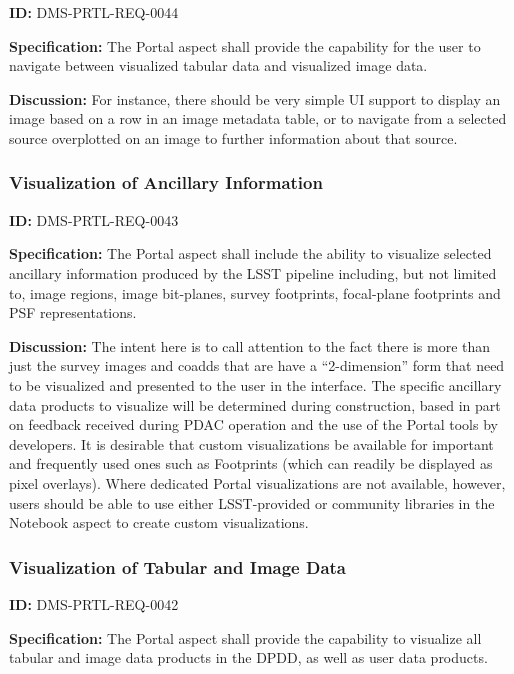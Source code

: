 \documentclass[SE,toc,lsstdraft]{lsstdoc}
\begin{document}
\label{DMS-PRTL-REQ-0044}
\textbf{ID:} DMS-PRTL-REQ-0044

\textbf{Specification:}
The Portal aspect shall provide the capability for the user to navigate between visualized tabular data and visualized image data.

\textbf{Discussion:}
For instance, there should be very simple UI support to display an image based on a row in an image metadata table, or to navigate from a selected source overplotted on an image to further information about that source.

\subsubsection{Visualization of Ancillary Information}

\label{DMS-PRTL-REQ-0043}
\textbf{ID:} DMS-PRTL-REQ-0043

\textbf{Specification:}
The Portal aspect shall include the ability to visualize selected ancillary information produced by the LSST pipeline including, but not limited to, image regions, image bit-planes, survey footprints, focal-plane footprints and PSF representations.

\textbf{Discussion:}
The intent here is to call attention to the fact there is more than just the survey images and coadds that are have a “2-dimension” form that need to be visualized and presented to the user in the interface.
The specific ancillary data products to visualize will be determined during construction, based in part on feedback received during PDAC operation and the use of the Portal tools by developers.
It is desirable that custom visualizations be available for important and frequently used ones such as Footprints (which can readily be displayed as pixel overlays).  Where dedicated Portal visualizations are not available, however, users should be able to use either LSST-provided or community libraries in the Notebook aspect to create custom visualizations.

\subsubsection{Visualization of Tabular and Image Data}

\label{DMS-PRTL-REQ-0042}
\textbf{ID:} DMS-PRTL-REQ-0042

\textbf{Specification:}
The Portal aspect shall provide the capability to visualize all tabular and image data products in the DPDD, as well as user data products.
\end{document}
